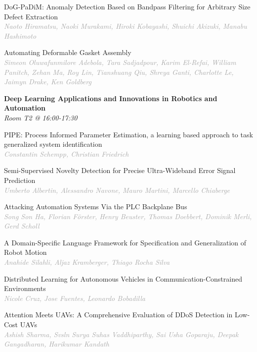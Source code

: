 \begin{multicols*}{2}
\small DoG-PaDiM: Anomaly Detection Based on Bandpass Filtering for Arbitrary Size Defect Extraction\\ 
\footnotesize \textcolor{darkgray}{\textit{Naoto Hiramatsu, Naoki  Murakami, Hiroki  Kobayashi, Shuichi  Akizuki, Manabu  Hashimoto}}

\small Automating Deformable Gasket Assembly\\ 
\footnotesize \textcolor{darkgray}{\textit{Simeon Oluwafunmilore Adebola, Tara  Sadjadpour, Karim  El-Refai, William  Panitch, Zehan  Ma, Roy  Lin, Tianshuang  Qiu, Shreya  Ganti, Charlotte  Le, Jaimyn  Drake, Ken  Goldberg}}

\normalsize \textbf{Deep Learning Applications and Innovations in Robotics and Automation}\\
\small \textit{Room T2 @ 16:00-17:30}

\small PIPE: Process Informed Parameter Estimation, a learning based approach to task generalized system identification\\ 
\footnotesize \textcolor{darkgray}{\textit{Constantin Schempp, Christian  Friedrich}}

\small Semi-Supervised Novelty Detection for Precise Ultra-Wideband Error Signal Prediction\\ 
\footnotesize \textcolor{darkgray}{\textit{Umberto Albertin, Alessandro  Navone, Mauro  Martini, Marcello  Chiaberge}}

\small Attacking Automation Systems Via the PLC Backplane Bus\\ 
\footnotesize \textcolor{darkgray}{\textit{Song Son Ha, Florian  Förster, Henry  Beuster, Thomas  Doebbert, Dominik  Merli, Gerd  Scholl}}

\small A Domain-Specific Language Framework for Specification and Generalization of Robot Motion\\ 
\footnotesize \textcolor{darkgray}{\textit{Anahide Silahli, Aljaz  Kramberger, Thiago  Rocha Silva}}

\small Distributed Learning for Autonomous Vehicles in Communication-Constrained Environments\\ 
\footnotesize \textcolor{darkgray}{\textit{Nicole Cruz, Jose  Fuentes, Leonardo  Bobadilla}}

\small Attention Meets UAVs: A Comprehensive Evaluation of DDoS Detection in Low-Cost UAVs\\ 
\footnotesize \textcolor{darkgray}{\textit{Ashish Sharma, Svsln Surya Suhas  Vaddhiparthy, Sai Usha  Goparaju, Deepak  Gangadharan, Harikumar  Kandath}}


\end{multicols*}
